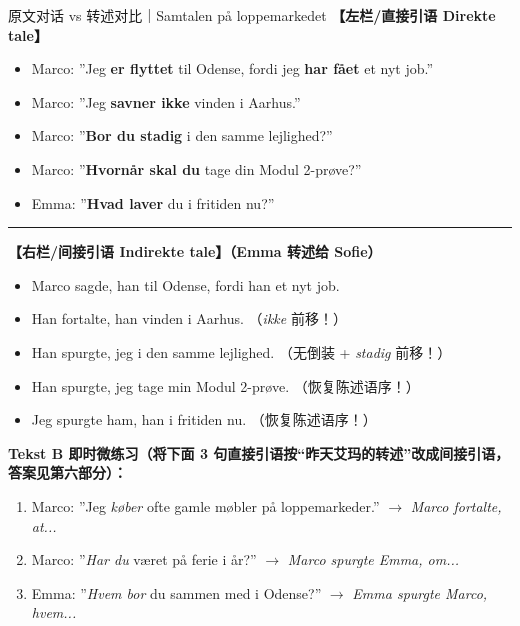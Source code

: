 \begin{emailbox}{原文对话 vs 转述对比｜Samtalen på loppemarkedet}
\textbf{【左栏/直接引语 Direkte tale】}
\begin{itemize}
  \item Marco: ”Jeg \textbf{er flyttet} til Odense, fordi jeg \textbf{har fået} et nyt job.”
  \item Marco: ”Jeg \textbf{savner ikke} vinden i Aarhus.”
  \item Marco: ”\textbf{Bor du stadig} i den samme lejlighed?”
  \item Marco: ”\textbf{Hvornår skal du} tage din Modul 2-prøve?”
  \item Emma: ”\textbf{Hvad laver} du i fritiden nu?”
\end{itemize}

\vspace{0.3em}
\hrule
\vspace{0.3em}

\textbf{【右栏/间接引语 Indirekte tale】（Emma 转述给 Sofie）}
\begin{itemize}
  \item Marco sagde,  han  til Odense, fordi han  et nyt job.
  \item Han fortalte,  han  vinden i Aarhus. （\textit{ikke} 前移！）
  \item Han spurgte,  jeg  i den samme lejlighed. （无倒装 + \textit{stadig} 前移！）
  \item Han spurgte,  jeg  tage min Modul 2-prøve. （恢复陈述语序！）
  \item Jeg spurgte ham,  han  i fritiden nu. （恢复陈述语序！）
\end{itemize}
\end{emailbox}

\textbf{Tekst B 即时微练习（将下面 3 句直接引语按“昨天艾玛的转述”改成间接引语，答案见第六部分）：}
\begin{enumerate}
  \item[(1)] Marco: ”Jeg \textit{køber} ofte gamle møbler på loppemarkeder.” $\rightarrow$ \textit{Marco fortalte, at...}
  \item[(2)] Marco: ”\textit{Har du} været på ferie i år?” $\rightarrow$ \textit{Marco spurgte Emma, om...}
  \item[(3)] Emma: ”\textit{Hvem bor} du sammen med i Odense?” $\rightarrow$ \textit{Emma spurgte Marco, hvem...}
\end{enumerate}

